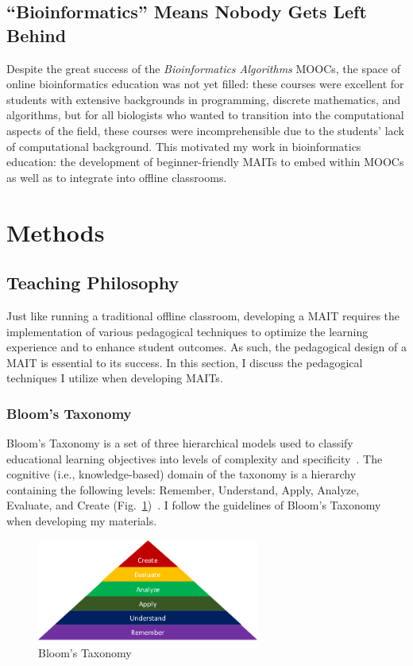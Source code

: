 \subsection{``Bioinformatics'' Means Nobody Gets Left Behind}
Despite the great success of the \textit{Bioinformatics Algorithms} \glspl{MOOC}, the space of online bioinformatics education was not yet filled: these courses were excellent for students with extensive backgrounds in programming, discrete mathematics, and algorithms, but for all biologists who wanted to transition into the computational aspects of the field, these courses were incomprehensible due to the students' lack of computational background. This motivated my work in bioinformatics education: the development of beginner-friendly \glspl{MAIT} to embed within \glspl{MOOC} as well as to integrate into offline classrooms.

\section{Methods}
\subsection{Teaching Philosophy}
Just like running a traditional offline classroom, developing a \gls{MAIT} requires the implementation of various pedagogical techniques to optimize the learning experience and to enhance student outcomes. As such, the pedagogical design of a \gls{MAIT} is essential to its success. In this section, I discuss the pedagogical techniques I utilize when developing \glspl{MAIT}.

\subsubsection{Bloom's Taxonomy}
Bloom's Taxonomy is a set of three hierarchical models used to classify educational learning objectives into levels of complexity and specificity~\cite{Bloom1956}. The cognitive (i.e., knowledge-based) domain of the taxonomy is a hierarchy containing the following levels: Remember, Understand, Apply, Analyze, Evaluate, and Create (Fig.~\ref{fig:education-bloom-taxonomy})~\cite{Anderson2001}. I follow the guidelines of Bloom's Taxonomy when developing my materials.

\begin{figure}
\centering
\includegraphics[width=0.65\textwidth]{figs/education-bloom-taxonomy}
\caption[Bloom's Taxonomy]
{Bloom's Taxonomy}
\label{fig:education-bloom-taxonomy}
\end{figure}

